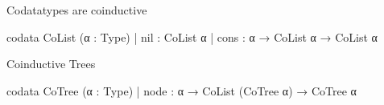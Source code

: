 \documentclass[t,12pt]{beamer}
\begin{document}
    


\begin{frame}[fragile]{Codatatypes are coinductive}
    \vfill
\begin{leancode}
codata CoList (α : Type)
  | nil  : CoList α
  | cons : α → CoList α → CoList α
\end{leancode}

\vfill

     
\end{frame}
    


\begin{frame}[fragile]{Coinductive Trees}
    \vfill
\begin{leancode}
codata CoTree (α : Type)
  | node : α → CoList (CoTree α) → CoTree α 
\end{leancode}

\medskip

\pause


\end{frame}
\end{document}
